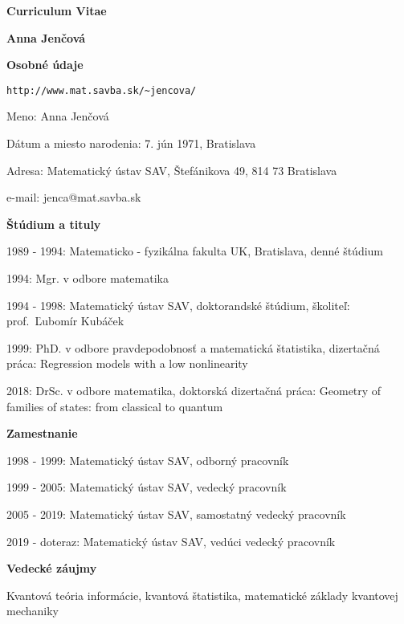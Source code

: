\documentclass[12pt]{article}
\begin{document}
\centerline{\large \textbf{Curriculum Vitae}}
\vskip 5pt
\centerline{\large \textbf{Anna Jen\v cov\'a}}
\vskip 0.5cm
\noindent
\textbf{Osobné údaje}


\begin{verbatim}http://www.mat.savba.sk/~jencova/\end{verbatim}

\begin{description}[noitemsep,leftmargin=3cm, font=\normalfont]
\item{Meno:} Anna Jen\v cov\'a
\item{Dátum a miesto narodenia:} 7. jún 1971,  Bratislava
\item{Adresa:} Matematický ústav SAV, \v Stef\'anikova 49, 814 73 Bratislava
\item{e-mail:} jenca@mat.savba.sk
\end{description}

\noindent
\textbf{\v Stúdium a tituly}
\begin{description}[noitemsep,leftmargin=2.6cm, font=\normalfont]
\item{1989 - 1994:} Matematicko - fyzikálna fakulta UK,  Bratislava, denné štúdium 
\item{1994:} Mgr. v odbore matematika
\item{1994 - 1998:} Matematický ústav SAV, doktorandské štúdium, školiteľ: prof.~Ľubomír Kub\'a\v cek
\item{1999:} PhD. v odbore pravdepodobnosť a matematická štatistika, dizertačná práca: Regression models with a low nonlinearity
\item{2018:} DrSc. v odbore matematika, doktorská dizertačná práca: Geometry of families of states: from classical to quantum 

\end{description}

\noindent
\textbf{Zamestnanie}
\begin{description}[noitemsep,leftmargin=3cm, font=\normalfont]
\item{1998 - 1999:} Matematický ústav SAV, odborný pracovník
\item{1999 - 2005:} Matematický ústav SAV, vedecký pracovník
\item{2005 - 2019:} Matematický ústav SAV, samostatný vedecký pracovník
\item{2019 - doteraz:} Matematický ústav SAV, vedúci vedecký pracovník
\end{description}

\noindent
\textbf{Vedecké záujmy}
\begin{description}[noitemsep,leftmargin=3cm, font=\normalfont]
\item Kvantová teória informácie, kvantová štatistika, matematické základy kvantovej mechaniky
\end{description}
\end{document}
